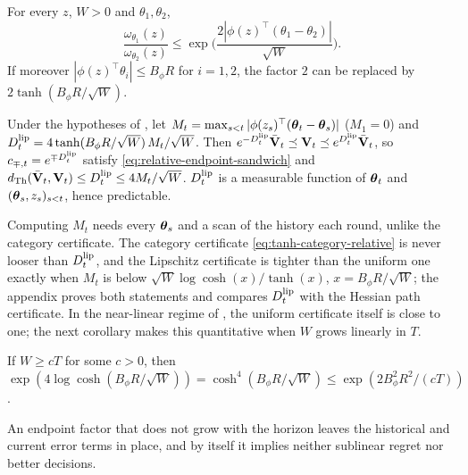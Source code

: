 \begin{lemma}
\label{lem:tanh-weight-lipschitz}
For every $z$, $W>0$ and $\theta_1,\theta_2$,
\[
 \frac{\omega_{\theta_1}(z)}{\omega_{\theta_2}(z)}
 \le\exp\!\Big(\frac{2|\phi(z)^\top(\theta_1-\theta_2)|}{\sqrt W}\Big).
\]
If moreover $|\phi(z)^\top\theta_i|\le B_\phi R$ for $i=1,2$, the factor $2$
can be replaced by $2\tanh(B_\phi R/\sqrt W)$.
\end{lemma}

\begin{corollary}
\label{cor:tanh-lipschitz-endpoint}
Under the hypotheses of , let
$M_t=\max_{s<t}|\phi(z_s)^\top(\boldsymbol{\theta}_t-\boldsymbol{\theta}_s)|$ ($M_1=0$) and
$D_t^{\rm lip}=4\tanh(B_\phi R/\sqrt W)\,M_t/\sqrt W$. Then
$e^{-D_t^{\rm lip}}\bar{\mathbf{V}}_t\preceq\mathbf{V}_t\preceq e^{D_t^{\rm lip}}\bar{\mathbf{V}}_t$, so
$c_{\mp,t}=e^{\mp D_t^{\rm lip}}$ satisfy \eqref{eq:relative-endpoint-sandwich}
and $d_{\rm Th}(\bar{\mathbf{V}}_t,\mathbf{V}_t)\le D_t^{\rm lip}\le4M_t/\sqrt W$.
$D_t^{\rm lip}$ is a measurable function of $\boldsymbol{\theta}_t$ and
$(\boldsymbol{\theta}_s,z_s)_{s<t}$, hence predictable.
\end{corollary}

Computing $M_t$ needs every $\boldsymbol{\theta}_s$ and a scan of the history each round,
unlike the category certificate. The category certificate
\eqref{eq:tanh-category-relative} is never looser than $D_t^{\rm lip}$, and
the Lipschitz certificate is tighter than the uniform one exactly when $M_t$
is below $\sqrt W\log\cosh(x)/\tanh(x)$, $x=B_\phi R/\sqrt W$; the appendix
proves both statements and compares $D_t^{\rm lip}$ with the Hessian path
certificate. In the near-linear regime of ,
the uniform certificate itself is close to one; the next corollary makes this
quantitative when $W$ grows linearly in $T$.

\begin{corollary}
\label{cor:tanh-endpoint-regime}
If $W\ge cT$ for some $c>0$, then
$\exp(4\log\cosh(B_\phi R/\sqrt W))=\cosh^4(B_\phi R/\sqrt W)
\le\exp(2B_\phi^2R^2/(cT))$.
\end{corollary}

An endpoint factor that does not grow with the horizon leaves the historical
and current error terms in place, and by itself it implies neither sublinear
regret nor better decisions.

